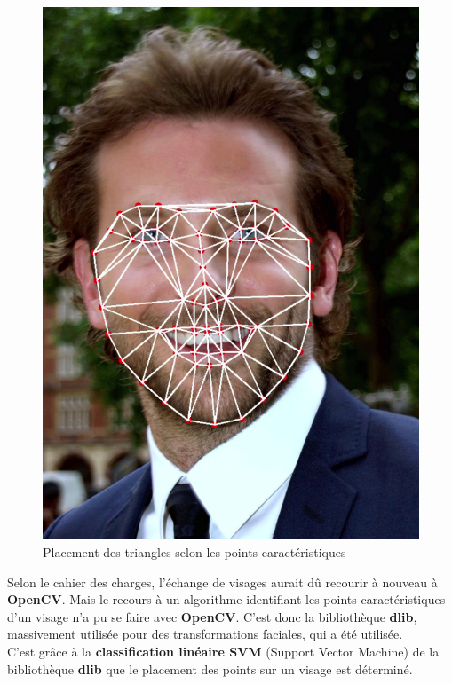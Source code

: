 \documentclass[a4paper,french]{article}
\begin{document}
\begin{figure}[H]
\begin{minipage}[b]{0.48\linewidth}
		\centering \includegraphics[scale=0.4]{figures/triangles.png}
        \caption{Placement des triangles selon les points caractéristiques}
        \label{fig:Triangle}
	\end{minipage}
\end{figure}

Selon le cahier des charges, l'échange de visages aurait dû recourir à nouveau à \textbf{OpenCV}. Mais le recours à un algorithme identifiant les points caractéristiques d'un visage n'a pu se faire avec \textbf{OpenCV}. C'est donc la bibliothèque \textbf{dlib}, massivement utilisée pour des transformations faciales, qui a été utilisée.\\ C'est grâce à la \textbf{classification linéaire SVM} (Support Vector Machine) de la bibliothèque \textbf{dlib} que le placement des points sur un visage est déterminé.\\
\end{document}
